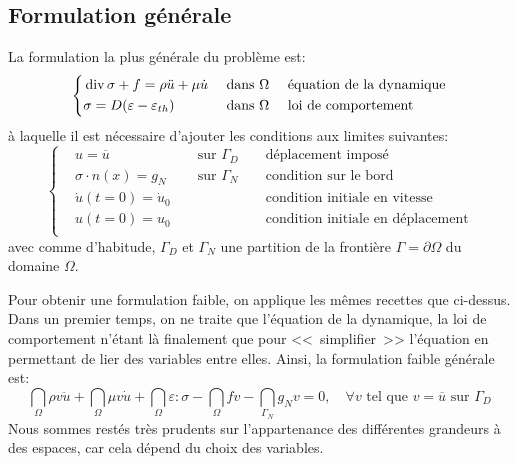 \subsection{Formulation générale}
La formulation la plus générale du problème est:
\begin{equation}
\left\{
\begin{aligned}
&\operatorname{div}\sigma + f = \rho \ddot{u} + \mu \dot{u} && \text{ dans } \Omega && \text{ équation de la dynamique}\\
&\sigma=D(\varepsilon-\varepsilon_{th}) && \text{ dans } \Omega && \text{ loi de comportement}\\
\end{aligned}\right.
\end{equation}
à laquelle il est nécessaire d'ajouter les conditions aux limites suivantes:
\begin{equation}
\left\{
\begin{aligned}
&u=\overline{u} && \text{ sur } \Gamma_D && \text{ déplacement imposé}\\
&\sigma\cdot n(x)=g_N && \text{ sur } \Gamma_N && \text{ condition sur le bord}\\
&\dot{u}(t=0) = \dot{u}_0&& && \text{ condition initiale en vitesse}\\
&u(t=0) = u_0 && && \text{ condition initiale en déplacement}\\
\end{aligned}
\right.
\end{equation}
avec comme d'habitude, $\Gamma_D$ et $\Gamma_N$ une partition de la
frontière $\Gamma=\partial\Omega$ du domaine $\Omega$.

\medskip
Pour obtenir une formulation faible, on applique les mêmes recettes
que ci-dessus. Dans un premier temps, on ne traite que l'équation de
la dynamique, la loi de comportement n'étant là finalement que pour
<<~simplifier~>> l'équation en permettant de lier des variables entre elles.
Ainsi, la formulation faible générale est:
\begin{equation}
\dint_\Omega \rho v\ddot{u} + \dint_\Omega \mu v\dot{u}
+\dint_\Omega \varepsilon:\sigma - \dint_\Omega fv
-\dint_{\Gamma_N} g_N v =0, \quad \forall v \text{ tel que } v=\overline{u} \text{ sur } \Gamma_D
\end{equation}
Nous sommes restés très prudents sur l'appartenance des différentes grandeurs
à des espaces, car cela dépend du choix des variables.

